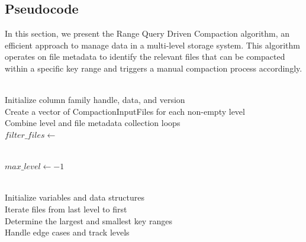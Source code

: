 \documentclass[balance=false, sigconf]{acmart}
\begin{document}
\subsection{Pseudocode}
In this section, we present the Range Query Driven Compaction algorithm, an efficient approach to manage data in a multi-level storage system. 
This algorithm operates on file metadata to identify the relevant files that can be compacted within a specific key range and triggers a manual 
compaction process accordingly.

\begin{algorithm}
    \raggedright
    \SetAlgoLined
    
    \BlankLine

     \\
    Initialize column family handle, data, and version \\
    Create a vector of CompactionInputFiles for each non-empty level \\
    Combine level and file metadata collection loops \\
    $filter\_files \gets$  \\
    \BlankLine

     \\
    $max\_level \gets -1$ \\
    \BlankLine

     \\
    Initialize variables and data structures \\
    Iterate files from last level to first \\
    Determine the largest and smallest key ranges \\
    Handle edge cases and track levels \\
     \\
    \BlankLine


\end{algorithm}
\end{document}
